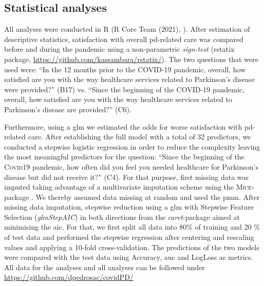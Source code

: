 \documentclass{bmcart}
\begin{document}
\subsection*{Statistical analyses}
All analyses were conducted in R (R Core Team (2021), \cite{rcore}). After estimation of descriptive statistics, satisfaction with overall \ac{pd}-related care was compared before and during the pandemic using a non-parametric \textit{sign-test} (rstatix package, \url{https://github.com/kassambara/rstatix/}). The two questions that were used were: ``In the 12 months prior to the COVID-19 pandemic, overall, how satisfied are you with the way healthcare services related to Parkinson’s disease were provided?'' (B17) vs. ``Since the beginning of the COVID-19 pandemic, overall, how satisfied are you with the way healthcare services related to Parkinson’s disease are provided?'' (C6). 

Furthermore, using a \ac{glm} we estimated the odds for worse satisfaction with \ac{pd}-related care. After establishing the full model with a total of 32 predictors, we conducted a stepwise logistic regression in order to reduce the complexity leaving the most meaningful predictors for the question: ``Since the beginning of the \textsc{Covid}19 pandemic, how often did you feel you needed healthcare for Parkinson’s disease but did not receive it?'' (C4). For that purpose, first missing data was imputed taking advantage of a multivariate imputation scheme using the \textsc{Mice}-package \cite{vanBuuren2011}. We thereby assumed data missing at random and used the \ac{pmm}. After missing data imputation, stepwise reduction using a \ac{glm} with Stepwise Feature Selection (\textit{glmStepAIC}) in both directions from the \textit{caret}-package aimed at minimising the \ac{aic}. For that, we first split all data into 80\% of training and 20 \% of test data and performed the stepwise regression after centering and rescaling values and applying a 10-fold cross-validation. The predictions of the two models were compared with the test data using Accuracy, \ac{auc} and LogLoss as metrics. All data for the analyses and all analyses can be followed under \url{https://github.com/dpedrosac/covidPD/}
\end{document}
